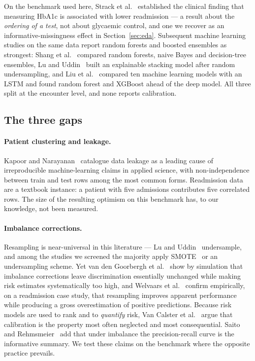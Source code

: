 \documentclass[runningheads]{llncs}
\begin{document}
On the benchmark used here, Strack et al.~\cite{strack2014} established the clinical
finding that measuring HbA1c is associated with lower readmission --- a result about
the \emph{ordering of a test}, not about glycaemic control, and one we recover as an
informative-missingness effect in Section~\ref{sec:eda}. Subsequent machine learning
studies on the same data report random forests and boosted ensembles as strongest:
Shang et al.~\cite{shang2021} compared random forests, naive Bayes and decision-tree
ensembles, Lu and Uddin~\cite{lu2022} built an explainable stacking model after random
undersampling, and Liu et al.~\cite{liu2024} compared ten machine learning models with
an LSTM and found random forest and XGBoost ahead of the deep model. All three split
at the encounter level, and none reports calibration.

\subsection{The three gaps}

\paragraph{Patient clustering and leakage.} Kapoor and Narayanan~\cite{kapoor2023}
catalogue data leakage as a leading cause of irreproducible machine-learning claims in
applied science, with non-independence between train and test rows among the most
common forms. Readmission data are a textbook instance: a patient with five admissions
contributes five correlated rows. The size of the resulting optimism on this benchmark
has, to our knowledge, not been measured.

\paragraph{Imbalance corrections.} Resampling is near-universal in this literature ---
Lu and Uddin~\cite{lu2022} undersample, and among the studies we screened the majority
apply SMOTE~\cite{chawla2002} or an undersampling scheme. Yet van den Goorbergh et
al.~\cite{goorbergh2022} show by simulation that imbalance corrections leave
discrimination essentially unchanged while making risk estimates systematically too
high, and Welvaars et al.~\cite{welvaars2023} confirm empirically, on a readmission
case study, that resampling improves apparent performance while producing a gross
overestimation of positive predictions. Because risk models are used to rank and to
\emph{quantify} risk, Van Calster et al.~\cite{vancalster2019} argue that calibration
is the property most often neglected and most consequential. Saito and
Rehmsmeier~\cite{saito2015} add that under imbalance the precision-recall curve is the
informative summary. We test these claims on the benchmark where the opposite practice
prevails.
\end{document}
